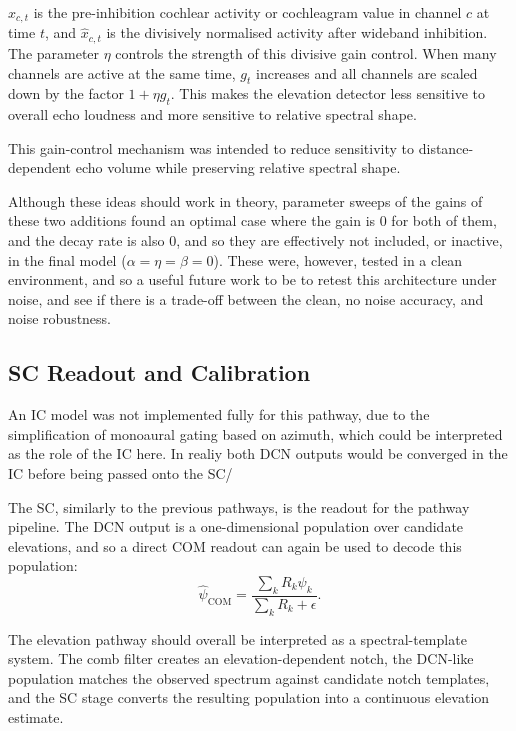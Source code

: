 $x_{c,t}$ is the pre-inhibition cochlear activity or cochleagram value in
channel $c$ at time $t$, and $\hat{x}_{c,t}$ is the divisively normalised
activity after wideband inhibition. The parameter $\eta$ controls the strength
of this divisive gain control. When many channels are active at the same time,
$g_t$ increases and all channels are scaled down by the factor
$1+\eta g_t$. This makes the elevation detector less sensitive to overall echo
loudness and more sensitive to relative spectral shape.

This gain-control mechanism was intended to reduce sensitivity to distance-dependent echo volume while preserving relative spectral shape.

Although these ideas should work in theory, parameter sweeps of the gains of these two additions found an optimal case where the gain is 0 for both of them, and the decay rate is also 0, and so they are effectively not included, or inactive, in the final model ($\alpha=\eta=\beta=0$). These were, however, tested in a clean environment, and so a useful future work to be to retest this architecture under noise, and see if there is a trade-off between the clean, no noise accuracy, and noise robustness.

\subsection{SC Readout and Calibration}

An IC model was not implemented fully for this pathway, due to the simplification of monoaural gating based on azimuth, which could be interpreted as the role of the IC here. In realiy both DCN outputs would be converged in the IC before being passed onto the SC/

The SC, similarly to the previous pathways, is the readout for the pathway pipeline. The DCN output is a one-dimensional population over candidate elevations, and so a direct COM readout can again be used to decode this population:
\begin{equation}
    \hat{\psi}_{\mathrm{COM}}
    =
    \frac{
        \sum_k R_k\psi_k
    }{
        \sum_k R_k+\epsilon
    }.
\end{equation}

The elevation pathway should overall be interpreted as a spectral-template system. The comb filter creates an elevation-dependent notch, the DCN-like population matches the observed spectrum against candidate notch templates, and the SC stage converts the resulting population into a continuous elevation estimate.

